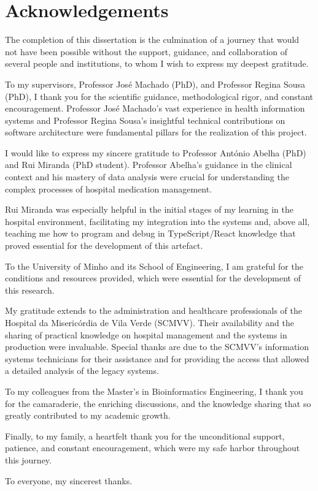 \chapter*{Acknowledgements}

The completion of this dissertation is the culmination of a journey that would not have been possible without the support, guidance, and collaboration of several people and institutions, to whom I wish to express my deepest gratitude.

To my supervisors, Professor José Machado (PhD), and Professor Regina Sousa (PhD), I thank you for the scientific guidance, methodological rigor, and constant encouragement. Professor José Machado's vast experience in health information systems and Professor Regina Sousa's insightful technical contributions on software architecture were fundamental pillars for the realization of this project.

I would like to express my sincere gratitude to Professor António Abelha (PhD) and Rui Miranda (PhD student). Professor Abelha’s guidance in the clinical context and his mastery of data analysis were crucial for understanding the complex processes of hospital medication management. 

Rui Miranda was especially helpful in the initial stages of my learning in the hospital environment, facilitating my integration into the systems and, above all, teaching me how to program and debug in TypeScript/React knowledge that proved essential for the development of this artefact.

To the University of Minho and its School of Engineering, I am grateful for the conditions and resources provided, which were essential for the development of this research.

My gratitude extends to the administration and healthcare professionals of the Hospital da Misericórdia de Vila Verde (SCMVV). Their availability and the sharing of practical knowledge on hospital management and the systems in production were invaluable. Special thanks are due to the SCMVV's information systems technicians for their assistance and for providing the access that allowed a detailed analysis of the legacy systems.

To my colleagues from the Master's in Bioinformatics Engineering, I thank you for the camaraderie, the enriching discussions, and the knowledge sharing that so greatly contributed to my academic growth.

Finally, to my family, a heartfelt thank you for the unconditional support, patience, and constant encouragement, which were my safe harbor throughout this journey.

To everyone, my sincerest thanks.

\cleardoublepage 